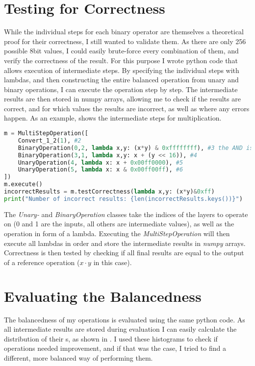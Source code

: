 \section{Testing for Correctness}
\label{correctness}
While the individual steps for each binary operator are themselves a theoretical proof for their correctness, I still wanted to validate them.
As there are only 256 possible 8bit values, I could easily brute-force every combination of them, and verify the correctness of the result.
For this purpose I wrote python code that allows execution of intermediate steps.
By specifying the individual steps with lambdas, and then constructing the entire balanced operation from unary and binary operations, I can execute the operation step by step.
The intermediate results are then stored in numpy arrays, allowing me to check if the results are correct, and for which values the results are incorrect, as well as where any errors happen.
As an example,  shows the intermediate steps for multiplication.

\begin{lstlisting}[language=python, caption=Step-by-step execution of balanced multiplication, label=lst:multiop]
m = MultiStepOperation([
    Convert_1_2(1), #2
    BinaryOperation(0,2, lambda x,y: (x*y) & 0xffffffff), #3 the AND is required due to python's arbitrary precision integers
    BinaryOperation(3,1, lambda x,y: x + (y << 16)), #4
    UnaryOperation(4, lambda x: x + 0x00ff0000), #5
    UnaryOperation(5, lambda x: x & 0x00ff00ff), #6
])
m.execute()
incorrectResults = m.testCorrectness(lambda x,y: (x*y)&0xff)
print("Number of incorrect results: {len(incorrectResults.keys())}")
\end{lstlisting}

The \emph{Unary-} and \emph{BinaryOperation} classes take the indices of the layers to operate on (0 and 1 are the inputs, all others are intermediate values), as well as the operation in form of a lambda.
Executing the \emph{MultiStepOperation} will then execute all lambdas in order and store the intermediate results in \emph{numpy} arrays.
Correctness is then tested by checking if all final results are equal to the output of a reference operation ($x \cdot y$ in this case).

\section{Evaluating the Balancedness}
\label{balance-eval}
The balancedness of my operations is evaluated using the same python code.
As all intermediate results are stored during evaluation I can easily calculate the distribution of their \hammingw s, as shown in .
I used these histograms to check if operations needed improvement, and if that was the case, I tried to find a different, more balanced way of performing them.

